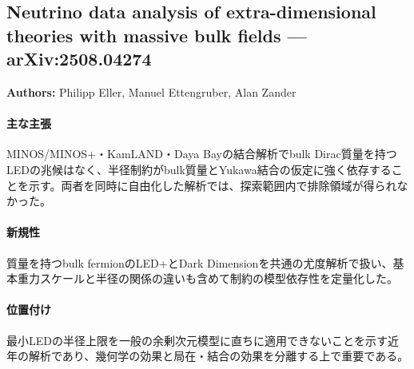 \subsection{Neutrino data analysis of extra-dimensional theories with massive bulk fields --- arXiv:2508.04274}

\textbf{Authors:} Philipp Eller, Manuel Ettengruber, Alan Zander

\paragraph{主な主張}
MINOS/MINOS+・KamLAND・Daya Bayの結合解析でbulk Dirac質量を持つLEDの兆候はなく、半径制約がbulk質量とYukawa結合の仮定に強く依存することを示す\cite{Eller:2025MassiveBulk}。両者を同時に自由化した解析では、探索範囲内で排除領域が得られなかった。

\paragraph{新規性}
質量を持つbulk fermionのLED+とDark Dimensionを共通の尤度解析で扱い、基本重力スケールと半径の関係の違いも含めて制約の模型依存性を定量化した。

\paragraph{位置付け}
最小LEDの半径上限を一般の余剰次元模型に直ちに適用できないことを示す近年の解析であり、幾何学の効果と局在・結合の効果を分離する上で重要である。
